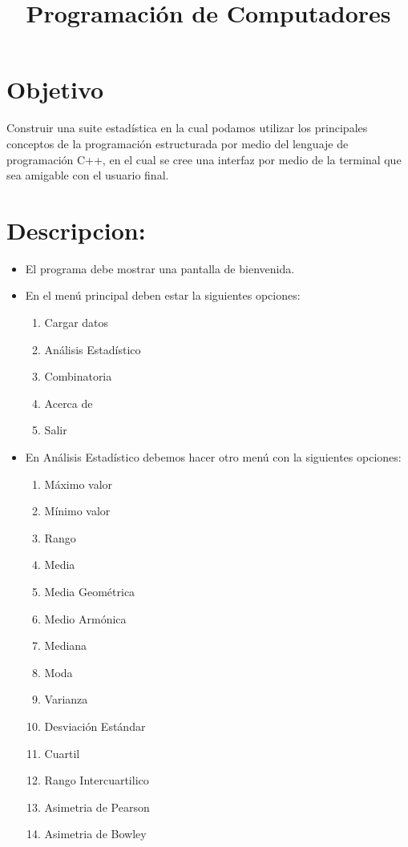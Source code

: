 \documentclass[10pt,a4paper]{article}
\title{Programación de Computadores}
\date{}
\begin{document}
\maketitle
\section{Objetivo}
Construir una suite estadística en la cual podamos utilizar los principales conceptos de la programación estructurada por medio del lenguaje de programación C++, en el cual se cree una interfaz por medio de la terminal que sea amigable con el usuario final.
\section{Descripcion:}


\begin{itemize}
	\item El programa debe mostrar una pantalla de bienvenida.
	\item En el menú principal deben estar la siguientes opciones:
		
	\begin{enumerate}
		\item Cargar datos
		\item Análisis Estadístico
		\item Combinatoria
		\item Acerca de
		\item Salir
	\end{enumerate}

	\item En Análisis Estadístico debemos hacer otro menú con la siguientes opciones:
	\begin{enumerate}
		\item Máximo valor
		\item Mínimo valor
		\item Rango
		\item Media
		\item Media Geométrica
		\item Medio Armónica
		\item Mediana
		\item Moda
		\item Varianza
		\item Desviación Estándar
		\item Cuartil
		\item Rango Intercuartilico
		\item Asimetria de Pearson
		\item Asimetria de Bowley
	\end{enumerate}
	

\end{itemize}
\end{document}

